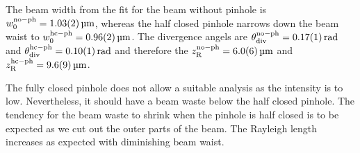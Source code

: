 The beam width from the fit for the beam without pinhole is $w_{\mathrm{0}}^{\mathrm{no-ph}} = \SI{1.03\pm0.02}{\micro\meter}$, whereas the half closed pinhole narrows down the beam waist to $w_{\mathrm{0}}^{\mathrm{hc-ph}} = \SI{0.96\pm0.02}{\micro\meter}$. The 
divergence angels are $\theta_{\mathrm{div}}^{\mathrm{no-ph}} = \SI{0.17\pm0.01}{rad}$ and $\theta_{\mathrm{div}}^{\mathrm{hc-ph}} = \SI{0.10\pm0.01}{rad}$ and therefore the $z_{\mathrm{R}}^{\mathrm{no-ph}} = \SI{6.0\pm0.6}{\micro\meter}$ and
$z_{\mathrm{R}}^{\mathrm{hc-ph}} = \SI{9.6\pm0.9}{\micro\meter}$.

The fully closed pinhole does not allow a suitable analysis as the intensity is to low. Nevertheless, it should have a beam waste below the half closed pinhole. 
The tendency for the beam waste to shrink when the pinhole is half closed is to be expected as we cut out the outer parts of the beam.
The Rayleigh length increases as expected with diminishing beam waist.